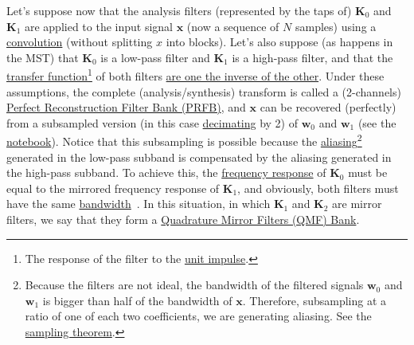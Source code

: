 Let's suppose now that the analysis filters (represented by the taps
of) ${\mathbf K}_0$ and ${\mathbf K}_1$ are applied to the input
signal ${\mathbf x}$ (now a sequence of $N$ samples) using a
\href{https://en.wikipedia.org/wiki/Kernel_(image_processing)}{convolution}
(without splitting $x$ into blocks). Let's also suppose (as happens in
the MST) that ${\mathbf K}_0$ is a low-pass filter and ${\mathbf K}_1$
is a high-pass filter, and that the
\href{https://en.wikipedia.org/wiki/Filter_(signal_processing)#The_transfer_function}{transfer
  function}\footnote{The response of the filter to the
\href{https://en.wikipedia.org/?title=Unit_impulse&redirect=no}{unit
  impulse}.} of both filters
\href{https://en.wikipedia.org/wiki/Filter_bank#Perfect_reconstruction_filter_banks}{are
  one the inverse of the other}. Under these assumptions, the complete
(analysis/synthesis) transform is called a (2-channels)
\href{https://en.wikipedia.org/wiki/Filter_bank#Perfect_reconstruction_filter_banks}{Perfect
  Reconstruction Filter Bank (PRFB)}, and ${\mathbf x}$ can be
recovered (perfectly) from a subsampled version (in this case
\href{https://en.wikipedia.org/wiki/Downsampling_(signal_processing)}{decimating}
by 2) of ${\mathbf w}_0$ and ${\mathbf w}_1$ (see the
\href{https://github.com/Tecnologias-multimedia/intercom/blob/master/docs/PRFB.ipynb}{notebook}). Notice
that this subsampling is possible because the
\href{https://en.wikipedia.org/wiki/Aliasing}{aliasing}\footnote{Because
the filters are not ideal, the bandwidth of the filtered signals
${\mathbf w}_0$ and ${\mathbf w}_1$ is bigger than half of the
bandwidth of ${\mathbf x}$. Therefore, subsampling at a ratio of one
of each two coefficients, we are generating aliasing. See the
\href{https://en.wikipedia.org/wiki/Nyquist-Shannon_sampling_theorem}{sampling
  theorem}.}  generated in the low-pass subband is compensated by the
aliasing generated in the high-pass subband. To achieve this, the
\href{https://en.wikipedia.org/wiki/Filter_(signal_processing)#The_transfer_function}{frequency
  response} of ${\mathbf K}_0$ must be equal to the mirrored frequency
response of ${\mathbf K}_1$, and obviously, both filters must have the
same
\href{https://en.wikipedia.org/wiki/Bandwidth_(signal_processing)}{bandwidth}~\cite{sayood2017introduction}. In
this situation, in which ${\mathbf K}_1$ and ${\mathbf K}_2$ are
mirror filters, we say that they form a
\href{https://en.wikipedia.org/wiki/Quadrature_mirror_filter}{Quadrature
  Mirror Filters (QMF) Bank}.

